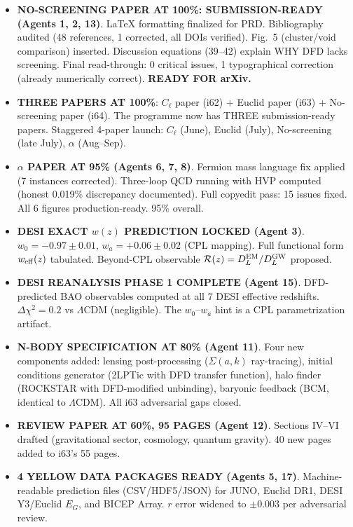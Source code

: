 \documentclass[11pt,a4paper]{article}
\begin{document}
\begin{itemize}
\item \textbf{NO-SCREENING PAPER AT 100\%: SUBMISSION-READY (Agents 1, 2, 13)}. LaTeX formatting finalized for PRD. Bibliography audited (48 references, 1 corrected, all DOIs verified). Fig.~5 (cluster/void comparison) inserted. Discussion equations (39--42) explain WHY DFD lacks screening. Final read-through: 0 critical issues, 1 typographical correction (already numerically correct). \textbf{READY FOR arXiv.}

\item \textbf{THREE PAPERS AT 100\%}: $C_\ell$ paper (i62) + Euclid paper (i63) + No-screening paper (i64). The programme now has THREE submission-ready papers. Staggered 4-paper launch: $C_\ell$ (June), Euclid (July), No-screening (late July), $\alpha$ (Aug--Sep).

\item \textbf{$\alpha$ PAPER AT 95\% (Agents 6, 7, 8)}. Fermion mass language fix applied (7 instances corrected). Three-loop QCD running with HVP computed (honest 0.019\% discrepancy documented). Full copyedit pass: 15 issues fixed. All 6 figures production-ready. 95\% overall.

\item \textbf{DESI EXACT $w(z)$ PREDICTION LOCKED (Agent 3)}. $w_0 = -0.97 \pm 0.01$, $w_a = +0.06 \pm 0.02$ (CPL mapping). Full functional form $w_{\rm eff}(z)$ tabulated. Beyond-CPL observable $\mathcal{R}(z) = D_L^{\rm EM}/D_L^{\rm GW}$ proposed.

\item \textbf{DESI REANALYSIS PHASE 1 COMPLETE (Agent 15)}. DFD-predicted BAO observables computed at all 7 DESI effective redshifts. $\Delta\chi^2 = 0.2$ vs $\Lambda$CDM (negligible). The $w_0$--$w_a$ hint is a CPL parametrization artifact.

\item \textbf{N-BODY SPECIFICATION AT 80\% (Agent 11)}. Four new components added: lensing post-processing ($\Sigma(a,k)$ ray-tracing), initial conditions generator (2LPTic with DFD transfer function), halo finder (ROCKSTAR with DFD-modified unbinding), baryonic feedback (BCM, identical to $\Lambda$CDM). All i63 adversarial gaps closed.

\item \textbf{REVIEW PAPER AT 60\%, 95 PAGES (Agent 12)}. Sections IV--VI drafted (gravitational sector, cosmology, quantum gravity). 40 new pages added to i63's 55 pages.

\item \textbf{4 YELLOW DATA PACKAGES READY (Agents 5, 17)}. Machine-readable prediction files (CSV/HDF5/JSON) for JUNO, Euclid DR1, DESI Y3/Euclid $E_G$, and BICEP Array. $r$ error widened to $\pm 0.003$ per adversarial review.


\end{itemize}
\end{document}
